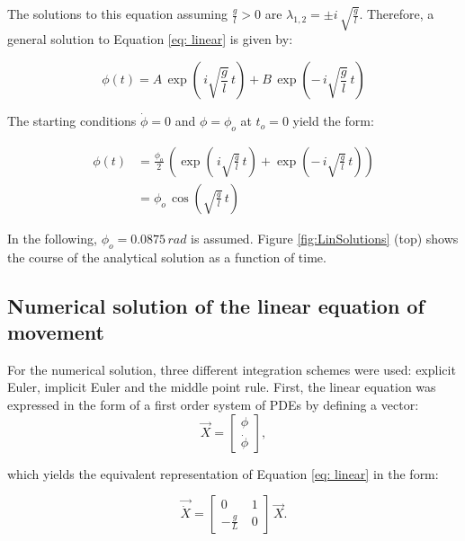 \documentclass[12pt,bibstyle=none,pagenumberinfooter]{ifmdocument}
\begin{document}
The solutions to this equation assuming $\frac{g}{l}>0$ are $\lambda_{1,2} = \pm i\,\sqrt{\frac{g}{l}}$. Therefore, a general solution to Equation \ref{eq: linear} is given by:

\begin{equation}
    \phi (t) = A\,\exp{\left(\,i\sqrt{\frac{g}{l}}\,t\right)} + B\, \exp{\left(-\,i\sqrt{\frac{g}{l}}\,t\right)}
\end{equation}

The starting conditions $\Dot{\phi} = 0$ and $\phi = \phi_o$ at $t_o = 0$ yield the form:

\begin{align}
    \phi(t)
    & = \frac{\phi_o}{2}\, \left(\exp{\left(\,i\sqrt{\frac{g}{l}}\,t\right)} + \exp{\left(-\,i\sqrt{\frac{g}{l}}\,t\right)} \right) \\
    & = \phi_o\,\cos{\left(\sqrt{\frac{g}{l}}\,t \right)}
\end{align}

In the following, $\phi_o = 0.0875\,rad$ is assumed. Figure \ref{fig:LinSolutions} (top) shows the course of the analytical solution as a function of time.


\subsection{Numerical solution of the linear equation of movement}

For the numerical solution, three different integration schemes were used: explicit Euler, implicit Euler and the middle point rule. First, the linear equation was expressed in the form of a first order system of PDEs by defining a vector:
\begin{equation}
    \Vec{X} = \begin{bmatrix}
        \phi \\ \Dot{\phi} 
        \end{bmatrix},
\end{equation}

which yields the equivalent representation of Equation \ref{eq: linear} in the form:

\begin{equation}
    \Vec{\Dot{X}} = \begin{bmatrix}
        0 & 1 \\ -\frac{g}{L}\ & 0 
        \end{bmatrix} \, \Vec{X}.
        \label{eq: firstOrderSysLin}
\end{equation}
\end{document}
